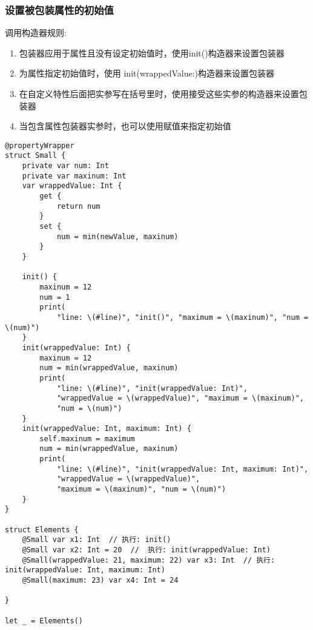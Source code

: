 \documentclass{../main.tex}{subfiles}
\begin{document}
\subsubsection{设置被包装属性的初始值}
调用构造器规则:
\begin{enumerate}[itemsep=0pt, parsep=0pt, topsep=0pt, partopsep=0pt]
    \item 包装器应用于属性且没有设定初始值时，使用init()构造器来设置包装器
    \item 为属性指定初始值时，使用 init(wrappedValue:)构造器来设置包装器
    \item 在自定义特性后面把实参写在括号里时，使用接受这些实参的构造器来设置包装器
    \item 当包含属性包装器实参时，也可以使用赋值来指定初始值
\end{enumerate}

\begin{lstlisting}[style = lstCodeStyleSwift, caption = {属性包装器设置被包装属性初始值}]
@propertyWrapper
struct Small {
    private var num: Int
    private var maxinum: Int
    var wrappedValue: Int {
        get {
            return num
        }
        set {
            num = min(newValue, maxinum)
        }
    }

    init() {
        maxinum = 12
        num = 1
        print(
            "line: \(#line)", "init()", "maximum = \(maxinum)", "num = \(num)")
    }
    init(wrappedValue: Int) {
        maxinum = 12
        num = min(wrappedValue, maxinum)
        print(
            "line: \(#line)", "init(wrappedValue: Int)",
            "wrappedValue = \(wrappedValue)", "maximum = \(maxinum)",
            "num = \(num)")
    }
    init(wrappedValue: Int, maximum: Int) {
        self.maxinum = maximum
        num = min(wrappedValue, maxinum)
        print(
            "line: \(#line)", "init(wrappedValue: Int, maximum: Int)",
            "wrappedValue = \(wrappedValue)",
            "maximum = \(maxinum)", "num = \(num)")
    }
}

struct Elements {
    @Small var x1: Int  // 执行: init()
    @Small var x2: Int = 20  //  执行: init(wrappedValue: Int)
    @Small(wrappedValue: 21, maximum: 22) var x3: Int  // 执行: init(wrappedValue: Int, maximum: Int)
    @Small(maximum: 23) var x4: Int = 24

}

let _ = Elements()

\end{lstlisting}
\end{document}

